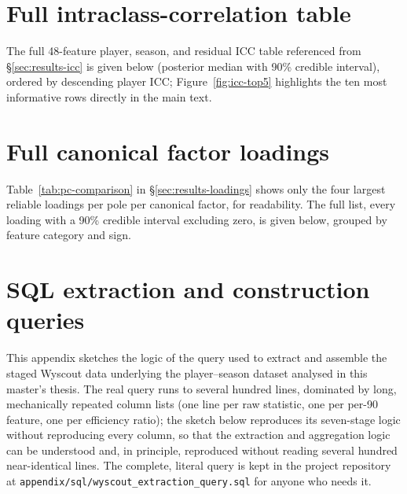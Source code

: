 \documentclass{fmetfm}
\begin{document}










\appendix
\chapter{Full intraclass-correlation table}
\label{app:icc}

The full 48-feature player, season, and residual ICC table referenced from \S\ref{sec:results-icc} is given
below (posterior median with 90\% credible interval), ordered by descending player ICC; Figure~\ref{fig:icc-top5}
highlights the ten most informative rows directly in the main text.

{\scriptsize

}

\chapter{Full canonical factor loadings}
\label{app:full-loadings}

Table~\ref{tab:pc-comparison} in \S\ref{sec:results-loadings} shows only the four largest reliable loadings per
pole per canonical factor, for readability. The full list, every loading with a 90\% credible interval
excluding zero, is given below, grouped by feature category and sign.

{\small

}

\chapter{SQL extraction and construction queries}
\label{app:sql}

This appendix sketches the logic of the query used to extract and assemble the staged Wyscout data underlying
the player--season dataset analysed in this master's thesis. The real query runs to several hundred lines,
dominated by long, mechanically repeated column lists (one line per raw statistic, one per per-90 feature, one
per efficiency ratio); the sketch below reproduces its seven-stage logic without reproducing every column, so
that the extraction and aggregation logic can be understood and, in principle, reproduced without reading
several hundred near-identical lines. The complete, literal query is kept in the project repository at
\texttt{appendix/sql/wyscout\_extraction\_query.sql} for anyone who needs it.
\end{document}
